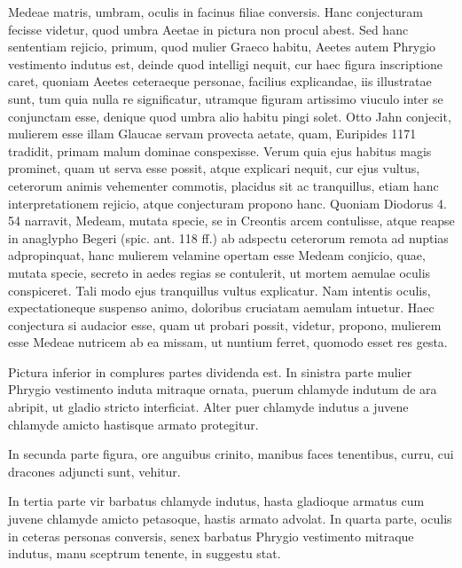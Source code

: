 \documentclass[a4paper, 11pt, oneside, polutonikogreek, german]{article}
\begin{document}
Medeae matris, umbram, oculis in facinus filiae conversis. Hanc conjecturam fecisse videtur, quod umbra Aeetae in pictura non procul abest. Sed hanc sententiam rejicio, primum, quod mulier Graeco habitu, Aeetes autem Phrygio vestimento indutus est, deinde quod intelligi nequit, cur haec figura inscriptione caret, quoniam Aeetes ceteraeque personae, facilius explicandae, iis illustratae sunt, tum quia nulla re significatur, utramque figuram artissimo viuculo inter se conjunctam esse, denique quod umbra alio habitu pingi solet. Otto Jahn conjecit, mulierem esse illam Glaucae servam provecta aetate, quam, Euripides 1171 tradidit, primam malum dominae conspexisse. Verum quia ejus habitus magis prominet, quam ut serva esse possit, atque explicari nequit, cur ejus vultus, ceterorum animis vehementer commotis, placidus sit ac tranquillus, etiam hanc interpretationem rejicio, atque conjecturam propono hanc. Quoniam Diodorus 4. 54 narravit, Medeam, mutata specie, se in Creontis arcem contulisse, atque reapse in anaglypho Begeri (spic. ant. 118 ff.) ab adspectu ceterorum remota ad nuptias adpropinquat, hanc mulierem velamine opertam esse Medeam conjicio, quae, mutata specie, secreto in aedes regias se contulerit, ut mortem aemulae oculis conspiceret. Tali modo ejus tranquillus vultus explicatur. Nam intentis oculis, expectationeque suspenso animo, doloribus cruciatam aemulam intuetur. Haec conjectura si audacior esse, quam ut probari possit, videtur, propono, mulierem esse Medeae nutricem ab ea missam, ut nuntium ferret, quomodo esset res gesta.

Pictura inferior in complures partes dividenda est. In sinistra parte mulier Phrygio vestimento induta mitraque ornata, puerum chlamyde indutum de ara abripit, ut gladio stricto interficiat. Alter puer chlamyde indutus a juvene chlamyde amicto hastisque armato protegitur.

In secunda parte figura, ore anguibus crinito, manibus faces tenentibus, curru, cui dracones adjuncti sunt, vehitur.

In tertia parte vir barbatus chlamyde indutus, hasta gladioque armatus cum juvene chlamyde amicto petasoque, hastis armato advolat. In quarta parte, oculis in ceteras personas conversis, senex barbatus Phrygio vestimento mitraque indutus, manu sceptrum tenente, in suggestu stat.
\end{document}
